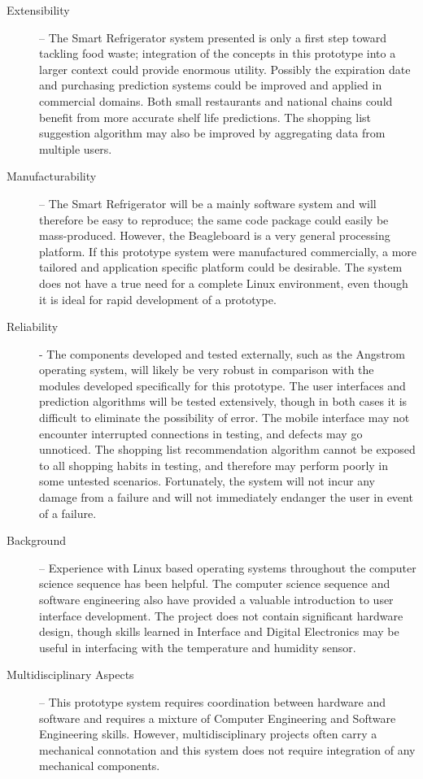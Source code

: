 \documentclass[11pt]{article} %
\begin{document}
\begin{description}
\item[Extensibility] -- The Smart Refrigerator system presented is only a first step toward tackling food waste; integration of the concepts in this prototype into a larger context could provide enormous utility. Possibly the expiration date and purchasing prediction systems could be improved and applied in commercial domains. Both small restaurants and national chains could benefit from more accurate shelf life predictions. The shopping list suggestion algorithm may also be improved by aggregating data from multiple users.
\item[Manufacturability] -- The Smart Refrigerator will be a mainly software system and will therefore be easy to reproduce; the same code package could easily be mass-produced. However, the Beagleboard is a very general processing platform. If this prototype system were manufactured commercially, a more tailored and application specific platform could be desirable. The system does not have a true need for a  complete Linux environment, even though it is ideal for rapid development of a prototype.
\item[Reliability] - The components developed and tested externally, such as the Angstrom operating system, will likely be very robust in comparison with the modules developed specifically for this prototype. The user interfaces and prediction algorithms will be tested extensively, though in both cases it is difficult to eliminate the possibility of error. The mobile interface may not encounter interrupted connections in testing, and defects may go unnoticed. The shopping list recommendation algorithm cannot be exposed to all shopping habits in testing, and therefore may perform poorly in some untested scenarios. Fortunately, the system will not incur any damage from a failure and will not immediately endanger the user in event of a failure.
\item[Background] -- Experience with Linux based operating systems throughout the computer science sequence has been helpful. The computer science sequence and software engineering also have provided a valuable introduction to user interface development. The project does not contain significant hardware design, though skills learned in Interface and Digital Electronics may be useful in interfacing with the temperature and humidity sensor.
\item[Multidisciplinary Aspects] -- This prototype system requires coordination between hardware and software and requires a mixture of Computer Engineering and Software Engineering skills. However, multidisciplinary projects often carry a mechanical connotation and this system does not require integration of any mechanical components.
\end{description}
\end{document}
